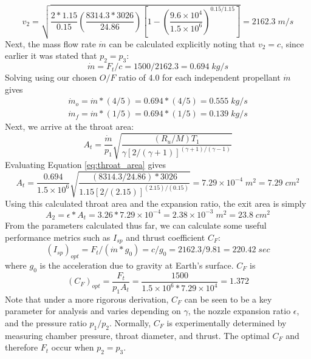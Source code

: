 \documentclass[9pt]{article} %
\numberwithin{equation}{section} %
\begin{document}
\begin{equation*} 
v_{2} = \sqrt{ \frac{2 * 1.15}{0.15} \left( \frac{8314.3 * 3026}{24.86} \right) \left[ 1- \left( \frac{9.6 \times 10^{4}}{1.5 \times 10^{6}} \right) ^{0.15/1.15} \right] } = 2162.3 \; m/s
\end{equation*}
Next, the mass flow rate $\dot{m}$ can be calculated explicitly noting that $v_{2} = c$, since earlier it was stated that $p_{2} = p_{3}$:
\begin{equation} \label{eq:mdot}
\dot{m} = F_{t}/c = 1500/2162.3 = 0.694 \; kg/s
\end{equation}
Solving using our chosen $O/F$ ratio of 4.0 for each independent propellant $\dot{m}$ gives
\begin{align*} 
\dot{m}_{o} = \dot{m} * (4/5) = 0.694 * (4/5) = 0.555 \; kg/s \\
\dot{m}_{f} = \dot{m} * (1/5) = 0.694 * (1/5) = 0.139 \; kg/s
\end{align*}
Next, we arrive at the throat area:
\begin{equation} \label{eq:throat_area}
A_{t} = \frac{\dot{m}}{p_{1}} \sqrt{ \frac{(R_{u}/M)T_{1}}{\gamma [2/(\gamma + 1)]^{(\gamma + 1)/(\gamma - 1)}} }
\end{equation}
Evaluating Equation \ref{eq:throat_area} gives
\begin{equation*} 
A_{t} = \frac{0.694}{1.5 \times 10^{6}} \sqrt{ \frac{(8314.3/24.86) * 3026}{1.15 [2/(2.15)]^{(2.15)/(0.15)}} } = 7.29 \times 10^{-4} \; m^{2} = 7.29 \; cm^{2}
\end{equation*}
Using this calculated throat area and the expansion ratio, the exit area is simply
\begin{equation} \label{eq:exit_area}
A_{2} = \epsilon * A_{t} = 3.26 * 7.29 \times 10 ^{-4} = 2.38 \times 10^{-3} \; m^{2} = 23.8 \; cm^{2}
\end{equation}
From the parameters calculated thus far, we can calculate some useful performance metrics such as $I_{sp}$ and thrust coefficient $C_{F}$:
\begin{equation} \label{eq:specific_impulse}
(I_{sp})_{opt} = F_{t}/(\dot{m} * g_{0}) = c/g_{0} = 2162.3/9.81 = 220.42 \; sec
\end{equation}
where $g_{0}$ is the acceleration due to gravity at Earth's surface. $C_{F}$ is
\begin{equation} \label{eq:thrust_coefficient}
(C_{F})_{opt} = \frac{F_{t}}{p_{1}A_{t}} = \frac{1500}{1.5 \times 10^{6} * 7.29 \times 10 ^{4}} = 1.372
\end{equation}
Note that under a more rigorous derivation, $C_{F}$ can be seen to be a key parameter for analysis and varies depending on $\gamma$, the nozzle expansion ratio $\epsilon$, and the pressure ratio $p_{1}/p_{2}$. Normally, $C_{F}$ is experimentally determined by measuring chamber pressure, throat diameter, and thrust. The optimal $C_{F}$ and therefore $F_{t}$ occur when $p_{2} = p_{3}$.
\end{document}
